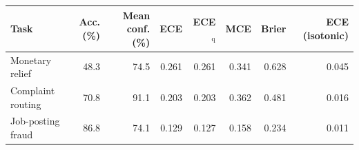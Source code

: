 \begin{tabular}{@{}lrrrrrrr@{}}
\toprule
Task & Acc. (\%) & Mean conf. (\%) & ECE & ECE$_{\mathrm{q}}$ & MCE & Brier & ECE (isotonic) \\
\midrule
Monetary relief & 48.3 & 74.5 & 0.261 & 0.261 & 0.341 & 0.628 & 0.045 \\
Complaint routing & 70.8 & 91.1 & 0.203 & 0.203 & 0.362 & 0.481 & 0.016 \\
Job-posting fraud & 86.8 & 74.1 & 0.129 & 0.127 & 0.158 & 0.234 & 0.011 \\
\bottomrule
\end{tabular}
